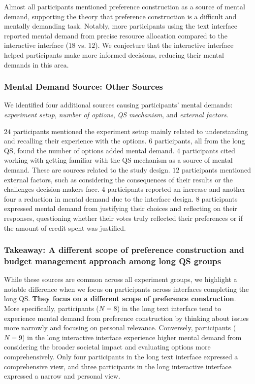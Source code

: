 Almost all participants mentioned preference construction as a source of mental demand, supporting the theory that preference construction is a difficult and mentally demanding task. Notably, more participants using the text interface reported mental demand from precise resource allocation compared to the interactive interface ($18$ vs. $12$). We conjecture that the interactive interface helped participants make more informed decisions, reducing their mental demands in this area.


\subsubsection{Mental Demand Source: Other Sources}
We identified four additional sources causing participants' mental demands: \textit{experiment setup}, \textit{number of options}, \textit{QS mechanism}, and \textit{external factors}. 

$24$ participants mentioned the experiment setup mainly related to understanding and recalling their experience with the options. $6$ participants, all from the long QS, found the number of options added mental demand. $4$ participants cited working with getting familiar with the QS mechanism as a source of mental demand. These are sources related to the study design. $12$ participants mentioned external factors, such as considering the consequences of their results or the challenges decision-makers face. $4$ participants reported an increase and another four a reduction in mental demand due to the interface design. $8$ participants expressed mental demand from justifying their choices and reflecting on their responses, questioning whether their votes truly reflected their preferences or if the amount of credit spent was justified.

\subsubsection{Takeaway: A different scope of preference construction and budget management approach among long QS groups}
\label{sec:mental_takeaway}

While these sources are common across all experiment groups, we highlight a notable difference when we focus on participants across interfaces completing the long QS. \textbf{They focus on a different scope of preference construction}. More specifically, participants ($N=8$) in the long text interface tend to experience mental demand from preference construction by thinking about issues more narrowly and focusing on personal relevance. Conversely, participants ($N=9$) in the long interactive interface experience higher mental demand from considering the broader societal impact and evaluating options more comprehensively. Only four participants in the long text interface expressed a comprehensive view, and three participants in the long interactive interface expressed a narrow and personal view.

